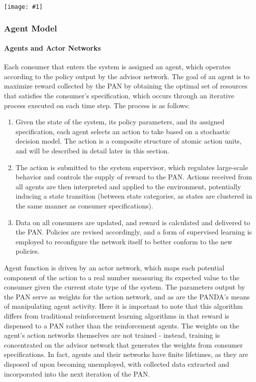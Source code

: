 \documentclass{article}
\theoremstyle{definition}
\theoremstyle{remark}
\newcommand{\addpic}[1]{\texttt{[image: \#1]}}
\begin{document}
				\addpic{figures/advisor_topology.png}

		\subsubsection{Agent Model}
		
			\paragraph{Agents and Actor Networks}

			Each consumer that enters the system is assigned an agent, which operates according to the policy output by the advisor network. The goal of an agent is to maximize reward collected by the PAN by obtaining the optimal set of resources that satisfies the consumer's specification, which occurs through an iterative process executed on each time step. The process is as follows:

			\begin{enumerate}

				\item Given the state of the system, its policy parameters, and its assigned specification, each agent selects an action to take based on a stochastic decision model. The action is a composite structure of atomic action units, and will be described in detail later in this section.

				\item The action is submitted to the system supervisor, which regulates large-scale behavior and controls the supply of reward to the PAN. Actions received from all agents are then interpreted and applied to the environment, potentially inducing a state transition (between state categories, as states are clustered in the same manner as consumer specifications).

				\item Data on all consumers are updated, and reward is calculated and delivered to the PAN. Policies are revised accordingly, and a form of supervised learning is employed to reconfigure the network itself to better conform to the new policies.

			\end{enumerate}

			Agent function is driven by an actor network, which maps each potential component of the action to a real number measuring its expected value to the consumer given the current state type of the system. The parameters output by the PAN serve as weights for the action network, and as are the PANDA's means of manipulating agent activity. Here it is important to note that this algorithm differs from traditional reinforcement learning algorithms in that reward is dispensed to a PAN rather than the reinforcement agents. The weights on the agent's action networks themselves are not trained - instead, training is concentrated on the advisor network that generates the weights from consumer specifications. In fact, agents and their networks have finite lifetimes, as they are disposed of upon becoming unemployed, with collected data extracted and incorporated into the next iteration of the PAN.
\end{document}
